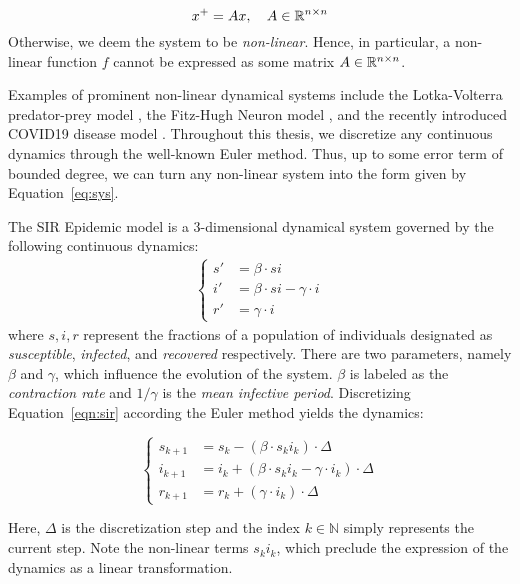 $$
x^{+} = Ax, \quad A \in {\mathbb{R}}^{n \times n}
$$
%
Otherwise, we deem the system to be \emph{non-linear}.
%
Hence, in particular, a non-linear function $f$ cannot be expressed as some matrix $A \in {\mathbb{R}}^{n \times n}$.

Examples of prominent non-linear dynamical systems include the Lotka-Volterra predator-prey model \cite{wangersky1978lotka}, the Fitz-Hugh Neuron model \cite{fitzhugh1961impulses}, and the recently introduced COVID19 disease model \cite{indiansuper2020supermodel}. Throughout this thesis, we discretize any continuous dynamics through the well-known Euler method. Thus, up to some error term of bounded degree, we can turn any non-linear system into the form given by Equation~\ref{eq:sys}.
%
\begin{example}
\label{ex:sir}
The SIR Epidemic model is a 3-dimensional dynamical system governed by the following continuous dynamics:
\begin{align} \label{eqn:sir}
    \begin{cases}
        s' &= \beta \cdot s i \\
        i' &= \beta \cdot s i - \gamma \cdot i \\
        r' &= \gamma \cdot i
    \end{cases}
\end{align}
where $s,i,r$ represent the fractions of a population of individuals designated as \textit{susceptible}, \textit{infected}, and \textit{recovered} respectively. There are two parameters, namely $\beta$ and $\gamma$, which influence the evolution of the system. $\beta$ is labeled as the \emph{contraction rate} and $1/\gamma$ is the \emph{mean infective period}.
%
Discretizing Equation~\ref{eqn:sir} according the Euler method yields the dynamics:

\begin{center}
\label{fig:discrete_sir}
  \begin{equation*}
      \begin{cases}
          s_{k+1} &= s_k - (\beta \cdot s_k i_k)\cdot\Delta \\
          i_{k+1} &= i_k + (\beta \cdot s_k i_k - \gamma \cdot i_k)\cdot\Delta \\
          r_{k+1} &= r_k + (\gamma\cdot i_k)\cdot\Delta
      \end{cases}
  \end{equation*}
\end{center}
 Here, $\Delta$ is the discretization step and the index $k \in \mathbb{N}$ simply represents the current step.
%
Note the non-linear terms $s_ki_k$, which preclude the expression of the dynamics as a linear transformation.
\end{example}

